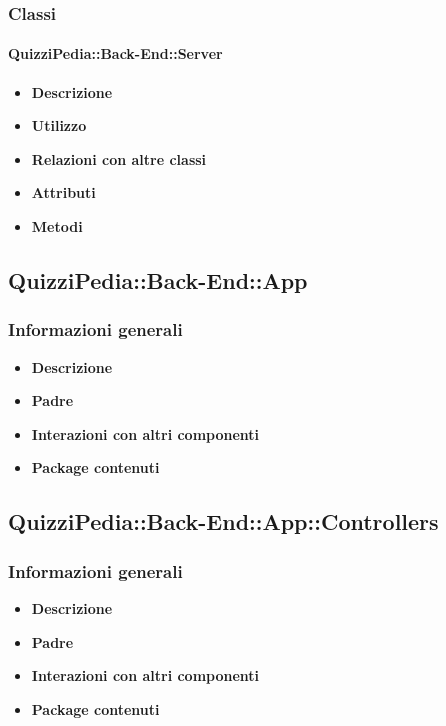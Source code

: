 \subsubsection{Classi}
	\paragraph{QuizziPedia::Back-End::Server}
	\begin{itemize}
		\item \textbf{Descrizione}
		\item \textbf{Utilizzo}
		\item \textbf{Relazioni con altre classi}
		\item \textbf{Attributi}
		\item \textbf{Metodi}
	\end{itemize}
	
\subsection{QuizziPedia::Back-End::App}
\subsubsection{Informazioni generali}
	\begin{itemize}
		\item \textbf{Descrizione} \\
		\item \textbf{Padre} \\
		\item \textbf{Interazioni con altri componenti} \\
		\item \textbf{Package contenuti}
	\end{itemize}
	
\subsection{QuizziPedia::Back-End::App::Controllers}
\subsubsection{Informazioni generali}
	\begin{itemize}
		\item \textbf{Descrizione} \\
		\item \textbf{Padre} \\
		\item \textbf{Interazioni con altri componenti} \\
		\item \textbf{Package contenuti}
	\end{itemize}
